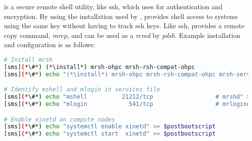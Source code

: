 \mrsh{} is a secure remote shell utility, like ssh, which uses \MUNGE{} 
for authentication and encryption. By using the \MUNGE{} installation used by 
\SLURM{}, \mrsh{} provides shell access to systems using the same \MUNGE{} key 
without having to track {ssh} keys. Like {ssh}, \mrsh{} provides a 
remote copy command, {\em mrcp}, and can be used as a {\em rcmd} by {\em
pdsh}. Example installation and configuration is as follows:

\begin{lstlisting}[language=bash,keywords={},upquote=true]
# Install mrsh
[sms](*\#*) (*\install*) mrsh-ohpc mrsh-rsh-compat-ohpc
[sms](*\#*) echo "(*\install*) mrsh-ohpc mrsh-rsh-compat-ohpc mrsh-server-ohpc" >> $postbootscript

# Identify mshell and mlogin in services file
[sms](*\#*) echo "mshell          21212/tcp                  # mrshd" >> /etc/services
[sms](*\#*) echo "mlogin            541/tcp                  # mrlogind" >> /etc/services

# Enable xinetd on compute nodes
[sms](*\#*) echo "systemctl enable xinetd" >> $postbootscript
[sms](*\#*) echo "systemctl start  xinetd" >> $postbootscript
\end{lstlisting}

